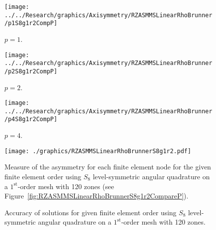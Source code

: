 \documentclass[12pt]{article}
\begin{document}
\begin{sidewaysfigure}[!htb]
\centering
\begin{subfigure}{0.33\textwidth}
\texttt{[image: ../../Research/graphics/Axisymmetry/RZASMMSLinearRhoBrunner/p1S8g1r2CompP]}
\caption{$p=1$.}
\end{subfigure}%
\begin{subfigure}{0.33\textwidth}
\texttt{[image: ../../Research/graphics/Axisymmetry/RZASMMSLinearRhoBrunner/p2S8g1r2CompP]}
\caption{$p=2$.}
\end{subfigure}%
\begin{subfigure}{0.33\textwidth}
\texttt{[image: ../../Research/graphics/Axisymmetry/RZASMMSLinearRhoBrunner/p4S8g1r2CompP]}
\caption{$p=4$.}
\end{subfigure}
\caption{Relative asymmetry for $p=\{1,2,4\}$ finite elements on a $1^\text{st}$-order mesh with 120 zones for $S_8$ level-symmetric angular quadrature.}
\label{fig:RZASMMSLinearRhoBrunnerS8g1r2CompareP}
\end{sidewaysfigure}

\begin{figure}[!htb]
\centering
\texttt{[image: ./graphics/RZASMMSLinearRhoBrunnerS8g1r2.pdf]}
\caption{Measure of the asymmetry for each finite element node for the given finite element order using $S_8$ level-symmetric angular quadrature on a $1^\text{st}$-order mesh with 120 zones (see Figure~\ref{fig:RZASMMSLinearRhoBrunnerS8g1r2CompareP}).}
\label{fig:RZASMMSLinearRhoBrunnerS8g1r2Nodes}
\end{figure}

\begin{figure}[!htb]
\centering
{}
\caption{Accuracy of solutions for given finite element order using $S_8$ level-symmetric angular quadrature on a $1^\text{st}$-order mesh with 120 zones.}
\label{fig:RZASMMSLinearRhoBrunnerS8g1r2Accuracy}
\end{figure}
\end{document}
